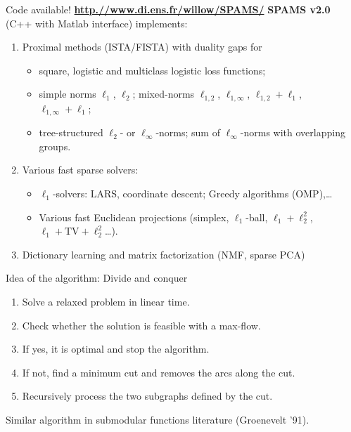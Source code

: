 \documentclass[final]{beamer}
\begin{document}
\begin{frame}{}
\begin{columns}[T]
\begin{column}{0.315\linewidth}
\end{column}\hfill
\begin{column}{0.315\linewidth}
\begin{alertblock}{Code available! \textbf{\url{http.//www.di.ens.fr/willow/SPAMS/}}}
\textbf{SPAMS v2.0} (C++ with Matlab interface) implements:
\begin{enumerate}
\item Proximal methods (ISTA/FISTA) with duality gaps for
\begin{itemize}
\item square, logistic and multiclass logistic loss functions;
\item simple norms $\ell_1$, $\ell_2$; mixed-norms $\ell_{1,2}$, $\ell_{1,\infty}$, $\ell_{1,2}+\ell_1$, $\ell_{1,\infty}+\ell_1$;
\item tree-structured $\ell_{2}$- or $\ell_{\infty}$-norms; sum of $\ell_{\infty}$-norms with overlapping groups.
\end{itemize}
\item Various fast sparse solvers:
\begin{itemize}
\item $\ell_1$-solvers: LARS, coordinate descent; Greedy algorithms (OMP),\ldots
\item Various fast Euclidean projections (simplex, $\ell_1$-ball, $\ell_1\!+\!\ell_2^2$,  $\ell_1\!+\!\text{TV}\!+\!\ell_2^2$\ldots).
\end{itemize}

\item Dictionary learning and matrix factorization (NMF, sparse PCA)
\end{enumerate}
\end{alertblock}
\begin{block}{Idea of the algorithm: Divide and conquer}
\begin{enumerate}
   \item Solve a relaxed problem in linear time.
   \item Check whether the solution is feasible with a max-flow.
   \item If yes, it is optimal and stop the algorithm.
   \item If not, find a minimum cut and removes the arcs along the cut.
   \item Recursively process the two subgraphs defined by the cut.
\end{enumerate}
Similar algorithm in submodular functions literature {\small (Groenevelt '91)}.
\end{block}


\end{column}
\end{columns}
\end{frame}
\end{document}
